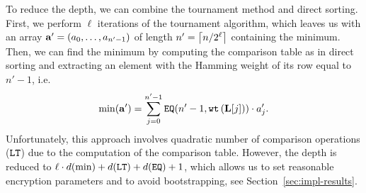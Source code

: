 	To reduce the depth, we can combine the tournament method and direct sorting.
	First, we perform $\ell$ iterations of the tournament algorithm, which leaves us with an array $\mathbf{a}' = (a_0, \dots, a_{n'-1})$ of length $n' = \left\lceil n/2^\ell \right\rceil$ containing the minimum.
	Then, we can find the minimum by computing the comparison table as in direct sorting and extracting an element with the Hamming weight of its row equal to $n'-1$, i.e.
	\begin{align*}
		\min(\mathbf{a}') = \sum_{j=0}^{n'-1} \mathtt{EQ}(n'-1,\texttt{wt}\left(\mathbf{L}[j]\right)) \cdot a'_j.
	\end{align*}
	Unfortunately, this approach involves quadratic number of comparison operations ($\mathtt{LT}$) due to the computation of the comparison table.
	However, the depth is reduced to $\ell \cdot d(\min) + d(\mathtt{LT}) + d(\mathtt{EQ}) + 1$, which allows us to set reasonable encryption parameters and to avoid bootstrapping, see Section~\ref{sec:impl-results}.
